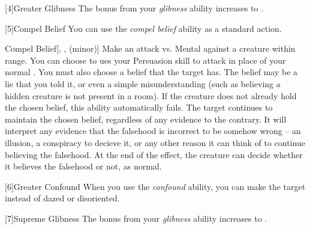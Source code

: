         [4]{Greater Glibness} The bonus from your \textit{glibness} ability increases to .

        [5]{Compel Belief} You can use the \textit{compel belief} ability as a standard action.
        \begin{apability}{Compel Belief}[, ,  (minor)]
            Make an attack vs. Mental against a creature within \rngmed range.
            You can choose to ues your Persuasion skill to attack in place of your normal .
            You must also choose a belief that the target has.
            The belief may be a lie that you told it, or even a simple misunderstanding (such as believing a hidden creature is not present in a room).
            If the creature does not already hold the chosen belief, this ability automatically fails.
            \hit The target continues to maintain the chosen belief, regardless of any evidence to the contrary.
            It will interpret any evidence that the falsehood is incorrect to be somehow wrong -- an illusion, a conspiracy to decieve it, or any other reason it can think of to continue believing the falsehood.
            At the end of the effect, the creature can decide whether it believes the falsehood or not, as normal.
        \end{apability}

        [6]{Greater Confound} When you use the \textit{confound} ability, you can make the target  instead of dazed or disoriented.

        [7]{Supreme Glibness} The bonus from your \textit{glibness} ability increases to .




